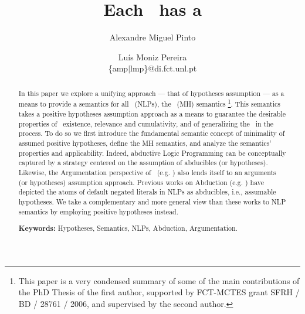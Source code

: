 \documentclass{llncs}
\author{Alexandre Miguel Pinto \and Lu\'is Moniz Pereira \\
		\{amp$|$lmp\}@di.fct.unl.pt}
\title{Each \nlp\ has a \twov\\ \MHs}
\institute{Centro de Intelig\^encia Artificial (CENTRIA), Departamento de Inform\'atica\\
		Faculdade de Ci\^encias e Tecnologia, Universidade Nova de Lisboa\\
		2829-516 Caparica, Portugal}
\begin{document}
	\maketitle
	\begin{abstract}
		In this paper we explore a unifying approach --- that of hypotheses assumption --- as a means to provide a semantics for all \NLPs\ 
		(NLPs), the \MH\ (MH) semantics
		\footnote{	This paper is a very condensed summary of some of the main contributions of the PhD Thesis \cite{PHDAMP} of the first author, supported by FCT-MCTES grant SFRH / BD / 28761 / 2006, and supervised by the second author.}.
		This semantics takes a positive hypotheses assumption approach as a means to guarantee the desirable properties of \m\ existence,
		relevance and cumulativity, and of generalizing the \SMss\ in the process.
		To do so we first introduce the fundamental semantic concept of minimality of assumed positive hypotheses, define the MH semantics, and
		analyze the semantics' properties and applicability. 
		Indeed, abductive Logic Programming can be conceptually captured by a strategy centered on the assumption of abducibles (or hypotheses).
		Likewise, the Argumentation perspective of \LPs\ (e.g. \cite{dung95acceptability}) also lends itself to an arguments (or hypotheses)
		assumption approach.
		Previous works on Abduction (e.g. \cite{DBLP:journals/logcom/KakasKT92}) have depicted the atoms of default
		negated literals in NLPs as abducibles, i.e., assumable hypotheses.
		We take a complementary and more general view than these works to NLP semantics by employing positive hypotheses instead.		
		
		{\bf Keywords:} Hypotheses, Semantics, NLPs, Abduction, Argumentation.
	\end{abstract}
	
\end{document}

